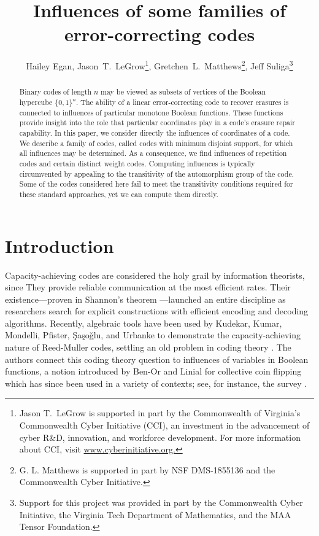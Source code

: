 \documentclass[12pt]{article}
\title{Influences of some families of error-correcting codes}
\author{Hailey Egan, Jason~T.~LeGrow\thanks{Jason T.~LeGrow is supported in part by the Commonwealth of Virginia's Commonwealth Cyber Initiative (CCI), an investment in the advancement of cyber R\&D, innovation, and workforce development. For more information about CCI, visit \url{www.cyberinitiative.org.}}, Gretchen~L.~Matthews\thanks{G. L. Matthews is supported in part by NSF DMS-1855136 and the Commonwealth Cyber Initiative.}, Jeff Suliga\thanks{Support for this project was provided in part by the Commonwealth Cyber Initiative, the Virginia Tech Department of Mathematics, and the MAA Tensor Foundation.}
\blfootnote{\noindent Author list in alphabetical order; see \url{https://ams.org/profession/leaders/ CultureStatement04.pdf.}}}
\date{ }
\theoremstyle{definition}
\begin{document}
\maketitle


\begin{abstract} %
Binary codes of length $n$ may be viewed as subsets of vertices of the Boolean hypercube $\{ 0, 1\}^n$. The ability of a linear error-correcting code to recover erasures is connected to influences of particular monotone Boolean functions. These functions provide insight into the role that particular coordinates play in a code’s erasure repair capability. In this paper, we consider directly the influences of coordinates of a code. We describe a family of codes, called codes with minimum disjoint support, for which all influences may be determined. As a consequence, we find influences of repetition codes and certain distinct weight codes. Computing influences is typically circumvented by appealing to the transitivity of the automorphism group of the code. Some of the codes considered here fail to meet the transitivity conditions required for these standard approaches, yet we can compute them directly.
\end{abstract}



\section{Introduction}


Capacity-achieving codes are considered the holy grail by information theorists, since They provide reliable communication at the most efficient rates. Their existence---proven in Shannon's theorem \cite{shannon}---launched an entire discipline as researchers search for explicit constructions with efficient encoding and decoding algorithms. Recently, algebraic tools have been used by Kudekar, Kumar, Mondelli, Pfister, Şaşoǧlu, and Urbanke to demonstrate the capacity-achieving nature of Reed-Muller codes, settling an old problem in coding theory \cite{Kudekar_17}. The authors connect this coding theory question to influences of variables in Boolean functions, a notion introduced by Ben-Or and Linial \cite{Ben-Or}  for collective coin flipping which has since been used in a variety of contexts; see, for instance, the survey \cite{survey}. 
\end{document}
